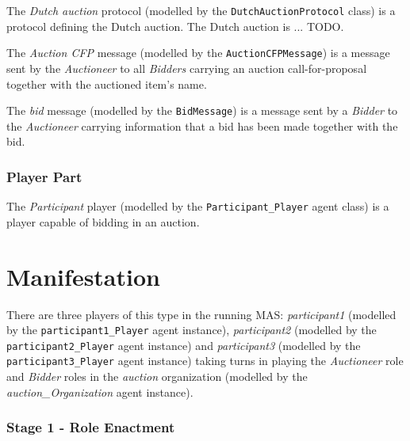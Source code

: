 The \textit{Dutch auction} protocol (modelled by the \texttt{DutchAuctionProtocol} class) is a protocol defining the Dutch auction.
The Dutch auction is ... TODO.

The \textit{Auction CFP} message (modelled by the \texttt{AuctionCFPMessage}) is a message sent by the \textit{Auctioneer} to all \textit{Bidders} carrying an auction call-for-proposal together with the auctioned item's name.

The \textit{bid} message (modelled by the \texttt{BidMessage}) is a message sent by a \textit{Bidder} to the \textit{Auctioneer} carrying information that a bid has been made together with the bid.

\subsubsection*{Player Part}

The \textit{Participant} player (modelled by the \texttt{Participant\_Player} agent class) is a player capable of bidding in an auction.

\section{Manifestation}

There are three players of this type in the running MAS: \textit{participant1} (modelled by the \texttt{participant1\_Player} agent instance), \textit{participant2} (modelled by the \texttt{participant2\_Player} agent instance) and \textit{participant3} (modelled by the \texttt{participant3\_Player} agent instance) taking turns in playing the \textit{Auctioneer} role and \textit{Bidder} roles in the \textit{auction} organization (modelled by the \textit{auction\_Organization} agent instance).

\subsubsection*{Stage 1 - Role Enactment}

